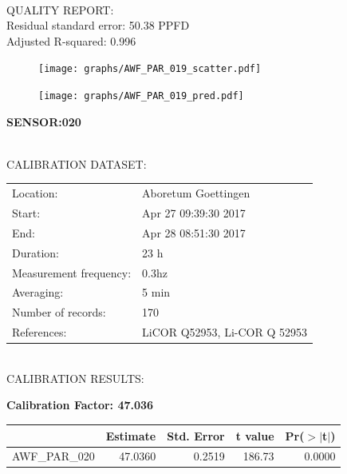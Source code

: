\documentclass[oneside]{report}
\begin{document}
\hrulefill\\
QUALITY REPORT:\\
Residual standard error: 50.38 PPFD\\
Adjusted R-squared: 0.996



\begin{figure}[H]
  \centering
  \texttt{[image: graphs/AWF\_PAR\_019\_scatter.pdf]}
\end{figure}




\begin{figure}[H]
  \centering
  \texttt{[image: graphs/AWF\_PAR\_019\_pred.pdf]}
\end{figure}

\pagebreak


\begin{center}
\large{\textbf{SENSOR:020}}\\
\end{center}

\hrulefill\\
CALIBRATION DATASET:\\
\begin{table}[h!]
  \centering
  \label{tab:table1}
  \begin{tabular}{ll}
    Location: & Aboretum Goettingen\\ 
    
    
    Start:  & Apr 27 09:39:30 2017 \\
    End:   & Apr 28 08:51:30 2017\\ 
    Duration: & 23 h\\
    Measurement frequency: & 0.3hz\\
    Averaging:  &5 min\\
    Number of records: & 170 \\
    References: & LiCOR Q52953, Li-COR Q 52953 \\
  \end{tabular}
\end{table}

\hrulefill\\
CALIBRATION RESULTS:\\


\begin{center}
\textbf{\large{Calibration Factor: 47.036}}\\
\end{center}
\begin{table}[ht]
\centering
\begin{tabular}{rrrrr}
  \hline
 & Estimate & Std. Error & t value & Pr($>$$|$t$|$) \\ 
  \hline
AWF\_PAR\_020 & 47.0360 & 0.2519 & 186.73 & 0.0000 \\ 
   \hline
\end{tabular}
\end{table}
\end{document}
